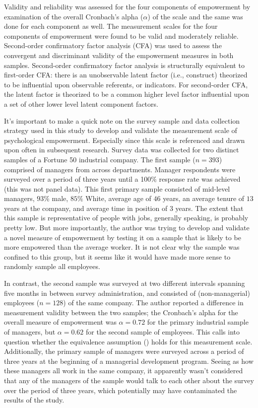 \documentclass[
  11pt,
  a4paper,
]{article}
\begin{document}
Validity and reliability was assessed for the four components of
empowerment by examination of the overall Cronbach's alpha (\(\alpha\))
of the scale and the same was done for each component as well. The
measurement scales for the four components of empowerment were found to
be valid and moderately reliable. Second-order confirmatory factor
analysis (CFA) was used to assess the convergent and discriminant
validity of the empowerment measures in both samples. Second-order
confirmatory factor analysis is structurally equivalent to first-order
CFA: there is an unobservable latent factor (i.e., construct) theorized
to be influential upon observable referents, or indicators. For
second-order CFA, the latent factor is theorized to be a common higher
level factor influential upon a set of other lower level latent
component factors.

It's important to make a quick note on the survey sample and data
collection strategy used in this study to develop and validate the
measurement scale of psychological empowerment. Especially since this
scale is referenced and drawn upon often in subsequent research. Survey
data was collected for two distinct samples of a Fortune 50 industrial
company. The first sample (\(n = 393\)) comprised of managers from
across departments. Manager respondents were surveyed over a period of
three years until a 100\% response rate was achieved (this was not panel
data). This first primary sample consisted of mid-level managers,
\(93\%\) male, \(85\%\) White, average age of \(46\) years, an average
tenure of \(13\) years at the company, and average time in position of
\(3\) years. The extent that this sample is representative of people
with jobs, generally speaking, is probably pretty low. But more
importantly, the author was trying to develop and validate a novel
measure of empowerment by testing it on a sample that is likely to be
more empowered than the average worker. It is not clear why the sample
was confined to this group, but it seems like it would have made more
sense to randomly sample all employees.

In contrast, the second sample was surveyed at two different intervals
spanning five months in between survey administration, and consisted of
(non-managerial) employees (\(n = 128\)) of the same company. The author
reported a difference in measurement validity between the two samples;
the Cronbach's alpha for the overall measure of empowerment was
\(\alpha = 0.72\) for the primary industrial sample of managers, but
\(\alpha = 0.62\) for the second sample of employees. This calls into
question whether the equivalence assumption
() holds for
this measurement scale. Additionally, the primary sample of managers
were surveyed across a period of three years at the beginning of a
managerial development program. Seeing as how these managers all work in
the same company, it apparently wasn't considered that any of the
managers of the sample would talk to each other about the survey over
the period of three years, which potentially may have contaminated the
results of the study.
\end{document}
